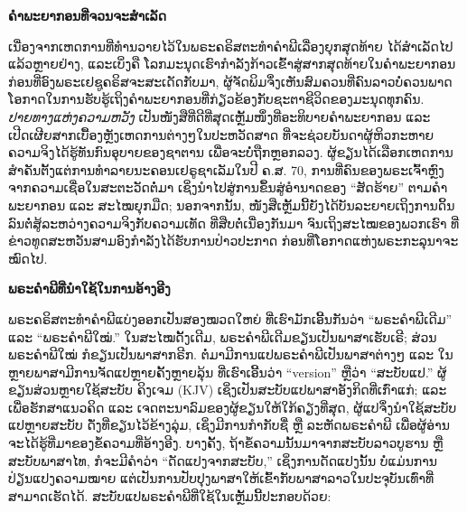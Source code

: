 
\textbf{ຄຳພະຍາກອນທີ່ຈວນຈະສຳເລັດ}

ເນື່ອງຈາກເຫດການທີ່ທຳນວາຍໄວ້ໃນພຣະຄຣິສຕະທຳຄຳພີເລື່ອງຍຸກສຸດທ້າຍ ໄດ້ສຳເລັດໄປແລ້ວຫຼາຍຢ່າງ, ແລະເບິ່ງຄື ໂລກມະນຸດເຮົາກຳລັງກ້າວເຂົ້າສູ່ສາກສຸດທ້າຍໃນຄຳພະຍາກອນ ກ່ອນທີ່ອົງພຣະເຢຊູຄຣິສຈະສະເດັດກັບມາ, ຜູ້ຈັດພິມຈຶ່ງເຫັນສົມຄວນທີ່ຄົນລາວບໍ່ຄວນພາດໂອກາດໃນການຮັບຮູ້ເຖິງຄຳພະຍາກອນທີ່ກ່ຽວຂ້ອງກັບຊະຕາຊີວິດຂອງມະນຸດທຸກຄົນ. \emph{ປາຍທາງແຫ່ງຄວາມຫວັງ} ເປັນໜັງສືທີ່ດີທີ່ສຸດເຫຼັ້ມໜຶ່ງທີ່ອະທິບາຍຄຳພະຍາກອນ ແລະ ເປີດເຜີຍສາກເບື້ອງຫຼັງເຫດການຕ່າງໆໃນປະຫວັດສາດ ທີ່ຈະຊ່ວຍບັນດາຜູ້ຫິວກະຫາຍຄວາມຈິງໄດ້ຮູ້ທັນກົນອຸບາຍຂອງຊາຕານ ເພື່ອຈະບໍ່ຖືກຫຼອກລວງ. ຜູ້ຂຽນໄດ້ເລືອກເຫດການສຳຄັນຕັ້ງແຕ່ການທຳລາຍນະຄອນເຢຣູຊາເລັມໃນປີ ຄ.ສ. 70, ການທີ່ຄົນຂອງພຣະເຈົ້າຫຼົງຈາກຄວາມເຊື່ອໃນສະຕະວັດຕໍ່ມາ ເຊິ່ງນຳໄປສູ່ການຂຶ້ນສູ່ອຳນາດຂອງ “ສັດຮ້າຍ” ຕາມຄຳພະຍາກອນ ແລະ ສະໄໝຍຸກມືດ; ນອກຈາກນັ້ນ, ໜັງສືເຫຼັ້ມນີ້ຍັງໄດ້ບັນລະຍາຍເຖິງການດິ້ນລົນຕໍ່ສູ້ລະຫວ່າງຄວາມຈິງກັບຄວາມເທັດ ທີ່ສືບຕໍ່ເນື່ອງກັນມາ ຈົນເຖິງສະໄໝຂອງພວກເຮົາ ທີ່ຂ່າວທູດສະຫວັນສາມອົງກຳລັງໄດ້ຮັບການປ່າວປະກາດ ກ່ອນທີ່ໂອກາດແຫ່ງພຣະກະລຸນາຈະໝົດໄປ.

\textbf{ພຣະຄຳພີທີ່ນຳໃຊ້ໃນການອ້າງອີງ}

ພຣະຄຣິສຕະທຳຄຳພີແບ່ງອອກເປັນສອງໝວດໃຫຍ່ ທີ່ເຮົາມັກເອີ້ນກັນວ່າ “ພຣະຄຳພີເດີມ” ແລະ “ພຣະຄຳພີໃໝ່.” ໃນສະໄໝດັ້ງເດີມ, ພຣະຄຳພີເດີມຂຽນເປັນພາສາເຮັບເຣີ; ສ່ວນພຣະຄຳພີໃໝ່ ກໍຂຽນເປັນພາສາກຣີກ. ຕໍ່ມາມີການແປພຣະຄຳພີເປັນພາສາຕ່າງໆ ແລະ ໃນຫຼາຍພາສາມີການຈັດແປຫຼາຍຄັ້ງຫຼາຍລຸ້ນ ທີ່ເຮົາເອີ້ນວ່າ “version” ຫຼືວ່າ “ສະບັບແປ.” ຜູ້ຂຽນສ່ວນຫຼາຍໃຊ້ສະບັບ ຄິງເຈມ (KJV) ເຊິ່ງເປັນສະບັບແປພາສາອັງກິດທີ່ເກົ່າແກ່; ແລະເພື່ອຮັກສາແນວຄິດ ແລະ ເຈດຕະນາລົມຂອງຜູ້ຂຽນໃຫ້ໃກ້ຄຽງທີ່ສຸດ, ຜູ້ແປຈຶ່ງນຳໃຊ້ສະບັບແປຫຼາຍສະບັບ ດັ່ງທີ່ຂຽນໄວ້ຂ້າງລຸ່ມ, ເຊິ່ງມີການກຳກັບຊື່ ຫຼື ລະຫັດພຣະຄຳພີ ເພື່ອຜູ້ອ່ານຈະໄດ້ຮູ້ທີ່ມາຂອງຂໍ້ຄວາມທີ່ອ້າງອີງ. ບາງຄັ້ງ, ຖ້າຂໍ້ຄວາມນັ້ນມາຈາກສະບັບລາວບູຮານ ຫຼື ສະບັບພາສາໄທ, ກໍຈະມີຄຳວ່າ “ດັດແປງຈາກສະບັບ,” ເຊິ່ງການດັດແປງນັ້ນ ບໍ່ແມ່ນການປ່ຽນແປງຄວາມໝາຍ ແຕ່ເປັນການປັບປຸງພາສາໃຫ້ເຂົ້າກັບພາສາລາວໃນປະຈຸບັນເທົ່າທີ່ສາມາດເຮັດໄດ້. ສະບັບແປພຣະຄຳພີທີ່ໃຊ້ໃນເຫຼັ້ມນີ້ປະກອບດ້ວຍ:

